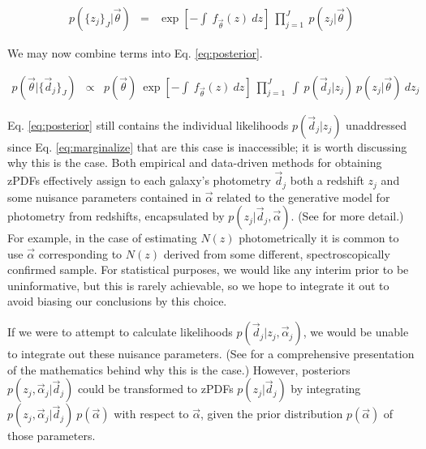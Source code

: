 \documentclass[preprint]{aastex}
\begin{document}
\begin{eqnarray}
\label{eq:indie}
p(\{z_{j}\}_{J}|\vec{\theta}) &=& \exp\left[-\int\ f_{\vec{\theta}}(z)\ dz\right]\ \prod_{j=1}^{J}\ p(z_{j}|\vec{\theta})
\end{eqnarray}


We may now combine terms into Eq. \ref{eq:posterior}.


\begin{eqnarray}
\label{eq:posterior}
p(\vec{\theta}|\{\vec{d}_{j}\}_{J}) &\propto& p(\vec{\theta})\ \exp\left[-\int\ f_{\vec{\theta}}(z)\ dz\right]\ \prod_{j=1}^{J}\ \int\ p(\vec{d}_{j}|z_{j})\ p(z_{j}|\vec{\theta})\ dz_{j}
\end{eqnarray}

Eq. \ref{eq:posterior} still contains the individual likelihoods $p(\vec{d}_{j}|z_{j})$ unaddressed since Eq. \ref{eq:marginalize} that are this case is inaccessible; it is worth discussing why this is the case.  Both empirical and data-driven methods for obtaining zPDFs effectively assign to each galaxy's photometry $\vec{d}_{j}$ both a redshift $z_{j}$ and some nuisance parameters contained in $\vec{\alpha}$ related to the generative model for photometry from redshifts, encapsulated by $p(z_{j}|\vec{d}_{j},\vec{\alpha})$.  (See \citet{ben98} for more detail.)  For example, in the case of estimating $N(z)$ photometrically it is common to use $\vec{\alpha}$ corresponding to $N(z)$ derived from some different, spectroscopically confirmed sample.  For statistical purposes, we would like any interim prior to be uninformative, but this is rarely achievable, so we hope to integrate it out to avoid biasing our conclusions by this choice. 

If we were to attempt to calculate likelihoods $p(\vec{d}_{j}|z_{j},\vec{\alpha}_{j})$, we would be unable to integrate out these nuisance parameters.  (See \citet{hog12} for a comprehensive presentation of the mathematics behind why this is the case.)  However, posteriors $p(z_{j},\vec{\alpha}_{j}|\vec{d}_{j})$ could be transformed to zPDFs $p(z_{j}|\vec{d}_{j})$ by integrating $p(z_{j},\vec{\alpha}_{j}|\vec{d}_{j})\ p(\vec{\alpha})$ with respect to $\vec{\alpha}$, given the prior distribution $p(\vec{\alpha})$ of those parameters.  
\end{document}
